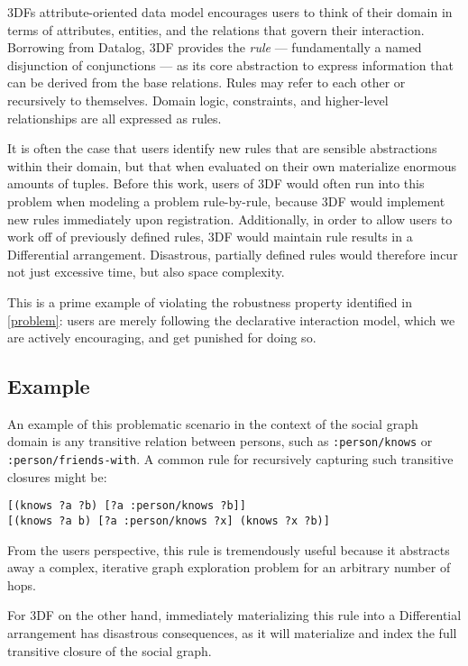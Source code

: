 \documentclass[../catalog.tex]{subfiles}
\begin{document}
3DFs attribute-oriented data model encourages users to think of their
domain in terms of attributes, entities, and the relations that govern
their interaction. Borrowing from Datalog, 3DF provides the
\emph{rule} — fundamentally a named disjunction of conjunctions — as
its core abstraction to express information that can be derived from
the base relations. Rules may refer to each other or recursively to
themselves. Domain logic, constraints, and higher-level relationships
are all expressed as rules.

It is often the case that users identify new rules that are sensible
abstractions within their domain, but that when evaluated on their own
materialize enormous amounts of tuples. Before this work, users of 3DF
would often run into this problem when modeling a problem
rule-by-rule, because 3DF would implement new rules immediately upon
registration. Additionally, in order to allow users to work off of
previously defined rules, 3DF would maintain rule results in a
Differential arrangement. Disastrous, partially defined rules would
therefore incur not just excessive time, but also space complexity.

This is a prime example of violating the robustness property
identified in \autoref{problem}: users are merely following the
declarative interaction model, which we are actively encouraging, and
get punished for doing so.

\subsection{Example}

An example of this problematic scenario in the context of the social
graph domain is any transitive relation between persons, such as
\texttt{:person/knows} or \texttt{:person/friends-with}. A common rule
for recursively capturing such transitive closures might be:

\begin{verbatim}
[(knows ?a ?b) [?a :person/knows ?b]]
[(knows ?a b) [?a :person/knows ?x] (knows ?x ?b)]
\end{verbatim}

From the users perspective, this rule is tremendously useful because
it abstracts away a complex, iterative graph exploration problem for
an arbitrary number of hops.

For 3DF on the other hand, immediately materializing this rule into a
Differential arrangement has disastrous consequences, as it will
materialize and index the full transitive closure of the social graph.
\end{document}
